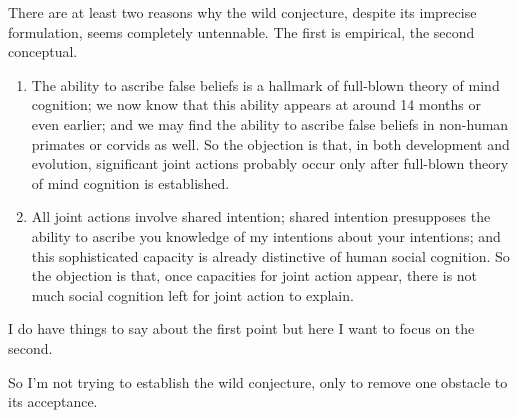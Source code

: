\documentclass[14pt,a4paper]{extarticle}
\begin{document}
There are at least two reasons why the wild conjecture, despite its imprecise formulation, seems completely untennable.  The first is empirical, the second conceptual.
%
\begin{enumerate}
\item The ability to ascribe false beliefs is a hallmark of full-blown theory of mind cognition; we now know that this ability appears at around 14 months or even earlier; and we may  find the ability to ascribe false beliefs in non-human primates or corvids as well.  So the objection is that, in both development and evolution, significant joint actions probably occur only after full-blown theory of mind cognition is established.

\item All joint actions involve shared intention; shared intention presupposes the ability to ascribe you knowledge of my intentions about your intentions; and this sophisticated capacity is already distinctive of human social cognition.  So the objection is that, once capacities for joint action appear, there is not much social cognition left for joint action to explain.
\end{enumerate}
%
I do have things to say about the first point but here I want to focus on the second.

So I'm not trying to establish the wild conjecture, only to remove one obstacle to its acceptance.

 


\end{document}
